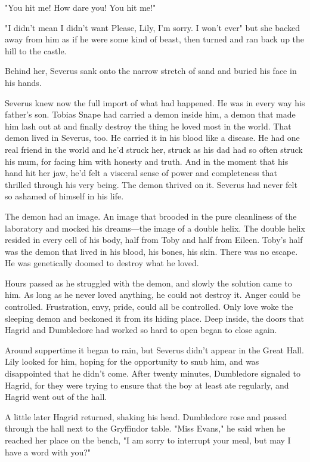"You hit me! How dare you! You hit me!"

"I didn't mean{\el} I didn't want{\el} Please, Lily, I'm sorry. {\el} I won't ever{\el}" but she backed away from him as if he were some kind of beast, then turned and ran back up the hill to the castle.

Behind her, Severus sank onto the narrow stretch of sand and buried his face in his hands.

Severus knew now the full import of what had happened. He was in every way his father's son. Tobias Snape had carried a demon inside him, a demon that made him lash out at and finally destroy the thing he loved most in the world. That demon lived in Severus, too. He carried it in his blood like a disease. He had one real friend in the world and he'd struck her, struck as his dad had so often struck his mum, for facing him with honesty and truth. And in the moment that his hand hit her jaw, he'd felt a visceral sense of power and completeness that thrilled through his very being. The demon thrived on it. Severus had never felt so ashamed of himself in his life.

The demon had an image. An image that brooded in the pure cleanliness of the laboratory and mocked his dreams—the image of a double helix. The double helix resided in every cell of his body, half from Toby and half from Eileen. Toby's half was the demon that lived in his blood, his bones, his skin. There was no escape. He was genetically doomed to destroy what he loved.

Hours passed as he struggled with the demon, and slowly the solution came to him. As long as he never loved anything, he could not destroy it. Anger could be controlled. Frustration, envy, pride, could all be controlled. Only love woke the sleeping demon and beckoned it from its hiding place. Deep inside, the doors that Hagrid and Dumbledore had worked so hard to open began to close again.

Around suppertime it began to rain, but Severus didn't appear in the Great Hall. Lily looked for him, hoping for the opportunity to snub him, and was disappointed that he didn't come. After twenty minutes, Dumbledore signaled to Hagrid, for they were trying to ensure that the boy at least ate regularly, and Hagrid went out of the hall.

A little later Hagrid returned, shaking his head. Dumbledore rose and passed through the hall next to the Gryffindor table. "Miss Evans," he said when he reached her place on the bench, "I am sorry to interrupt your meal, but may I have a word with you?"

